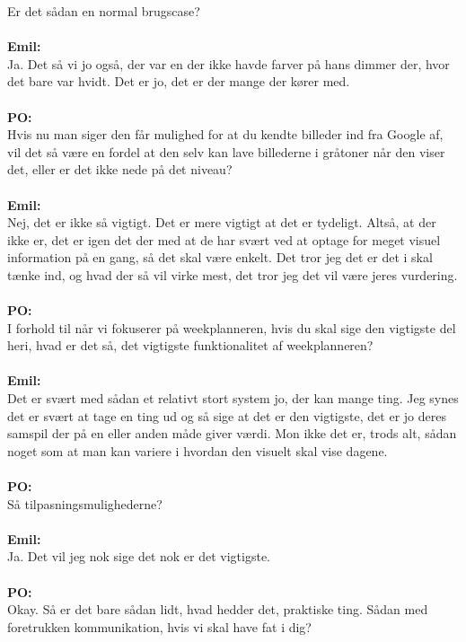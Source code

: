 Er det sådan en normal brugscase?
\\\\
\textbf{Emil:}\\
Ja.
Det så vi jo også, der var en der ikke havde farver på hans dimmer der, hvor det bare var hvidt. 
Det er jo, det er der mange der kører med. 
\\\\
\textbf{PO:}\\
Hvis nu man siger den får mulighed for at du kendte billeder ind fra Google af, vil det så være en fordel at den selv kan lave billederne i gråtoner når den viser det, eller er det ikke nede på det niveau?
\\\\
\textbf{Emil:}\\
Nej, det er ikke så vigtigt.
Det er mere vigtigt at det er tydeligt. 
Altså, at der ikke er, det er igen det der med at de har svært ved at optage for meget visuel information på en gang, så det skal være enkelt. 
Det tror jeg det er det i skal tænke ind, og hvad der så vil virke mest, det tror jeg det vil være jeres vurdering.
\\\\
\textbf{PO:}\\
I forhold til når vi fokuserer på weekplanneren, hvis du skal sige den vigtigste del heri, hvad er det så, det vigtigste funktionalitet af weekplanneren?
\\\\
\textbf{Emil:}\\
Det er svært med sådan et relativt stort system jo, der kan mange ting.
Jeg synes det er svært at tage en ting ud og så sige at det er den vigtigste, det er jo deres samspil der på en eller anden måde giver værdi.
Mon ikke det er, trods alt, sådan noget som at man kan variere i hvordan den visuelt skal vise dagene.
\\\\
\textbf{PO:}\\
Så tilpasningsmulighederne?
\\\\
\textbf{Emil:}\\
Ja.
Det vil jeg nok sige det nok er det vigtigste.
\\\\
\textbf{PO:}\\
Okay. Så er det bare sådan lidt, hvad hedder det, praktiske ting. 
Sådan med foretrukken kommunikation, hvis vi skal have fat i dig?
\\\\
